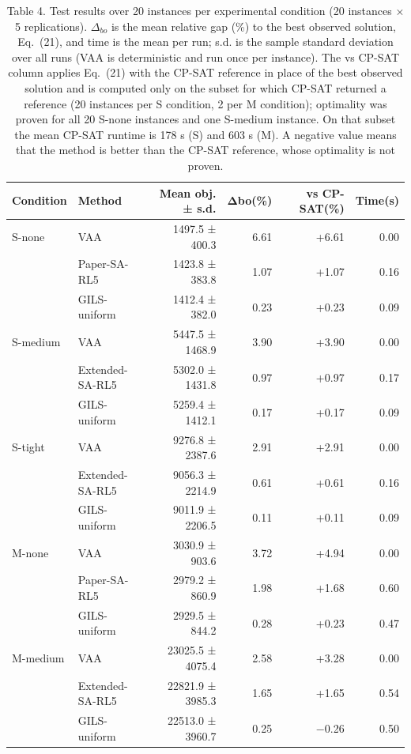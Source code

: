 \documentclass[10pt,a4paper]{article}
\begin{document}
\begin{table}[H]\centering
\caption{Table 4. Test results over 20 instances per experimental condition (20 instances $\times$ 5 replications). $\Delta_{bo}$ is the mean relative gap (\%) to the best observed solution, Eq.~(21), and time is the mean per run; s.d. is the sample standard deviation over all runs (VAA is deterministic and run once per instance). The vs CP-SAT column applies Eq.~(21) with the CP-SAT reference in place of the best observed solution and is computed only on the subset for which CP-SAT returned a reference (20 instances per S condition, 2 per M condition); optimality was proven for all 20 S-none instances and one S-medium instance. On that subset the mean CP-SAT runtime is 178 s (S) and 603 s (M). A negative value means that the method is better than the CP-SAT reference, whose optimality is not proven.}
\label{tab:main}\small
\begin{tabular}{@{}llrrrr@{}}
\toprule
Condition & Method & Mean obj. ± s.d. & Δbo(\%) & vs CP-SAT(\%) & Time(s)\\
\midrule
S-none & VAA & 1497.5 ± 400.3 & 6.61 & +6.61 & 0.00\\
 & Paper-SA-RL5 & 1423.8 ± 383.8 & 1.07 & +1.07 & 0.16\\
 & GILS-uniform & 1412.4 ± 382.0 & 0.23 & +0.23 & 0.09\\
S-medium & VAA & 5447.5 ± 1468.9 & 3.90 & +3.90 & 0.00\\
 & Extended-SA-RL5 & 5302.0 ± 1431.8 & 0.97 & +0.97 & 0.17\\
 & GILS-uniform & 5259.4 ± 1412.1 & 0.17 & +0.17 & 0.09\\
S-tight & VAA & 9276.8 ± 2387.6 & 2.91 & +2.91 & 0.00\\
 & Extended-SA-RL5 & 9056.3 ± 2214.9 & 0.61 & +0.61 & 0.16\\
 & GILS-uniform & 9011.9 ± 2206.5 & 0.11 & +0.11 & 0.09\\
M-none & VAA & 3030.9 ± 903.6 & 3.72 & +4.94 & 0.00\\
 & Paper-SA-RL5 & 2979.2 ± 860.9 & 1.98 & +1.68 & 0.60\\
 & GILS-uniform & 2929.5 ± 844.2 & 0.28 & +0.23 & 0.47\\
M-medium & VAA & 23025.5 ± 4075.4 & 2.58 & +3.28 & 0.00\\
 & Extended-SA-RL5 & 22821.9 ± 3985.3 & 1.65 & +1.65 & 0.54\\
 & GILS-uniform & 22513.0 ± 3960.7 & 0.25 & $-$0.26 & 0.50\\

\end{tabular}
\end{table}
\end{document}
